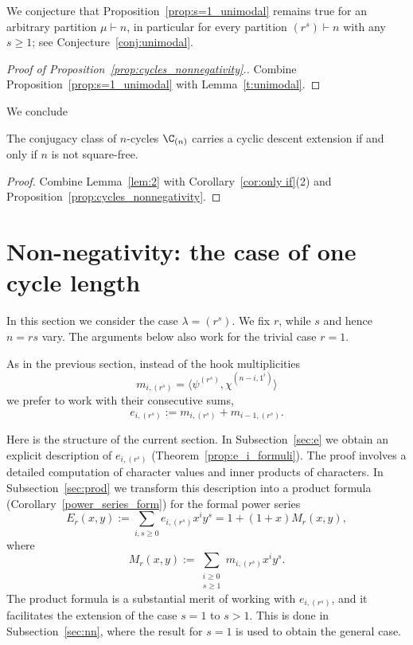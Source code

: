 \begin{remark}
	We conjecture that Proposition~\ref{prop:s=1_unimodal} remains true for an arbitrary partition $\mu \vdash n$, in particular for every partition $(r^s) \vdash n$ with any	$s\ge 1$; see Conjecture~\ref{conj:unimodal}.
\end{remark}

\begin{proof}[Proof of Proposition~\ref{prop:cycles_nonnegativity}.]
    Combine Proposition~\ref{prop:s=1_unimodal} with   Lemma~\ref{t:unimodal}.
\end{proof}

We conclude 

\begin{corollary}\label{prop:CDE_cycles}
    The conjugacy class of $n$-cycles $\C_{(n)}$ carries a cyclic descent extension if and only if $n$ is not square-free.
\end{corollary}
	 
\begin{proof} 
    Combine Lemma~\ref{lem:2} with Corollary~\ref{cor:only if}(2) and Proposition~\ref{prop:cycles_nonnegativity}. 
\end{proof}


\section{Non-negativity: the case of one cycle length}
\label{sec:Witt}

In this section we consider the case $\lambda = (r^s)$. 
We fix $r$, while $s$ and hence $n=rs$ vary. 
The arguments below also work for the trivial case $r=1$.
		
As in the previous section, instead of the hook multiplicities 
\[
    m_{i,(r^s)} 
    = \langle \psi^{(r^s)}, \chi^{(n-i,1^i)} \rangle
\]
we prefer to work with their consecutive sums,
\[
    e_{i,(r^s)} := m_{i,(r^s)} + m_{i-1,(r^s)}.
\]
		
Here is the structure of the current section.
In Subsection~\ref{sec:e} 
we obtain an explicit description of $e_{i,(r^s)}$ (Theorem~\ref{prop:e_i_formuli}). The proof involves a detailed computation of character values and inner products of characters.
In Subsection~\ref{sec:prod} we 
transform this description into
a product formula (Corollary~\ref{power_series_form})
for the formal power series 
\[
E_r(x,y) 
:= \sum_{i,s \ge 0} e_{i,(r^s)} x^i y^s 
= 1 + (1 + x) M_r(x,y),  
\]
where 
\[
M_r(x,y) 
:= \sum_{\substack{i \ge 0 \\ s \ge 1}} m_{i,(r^s)} x^i y^s.
\]
The product formula is a substantial merit of working with $e_{i,(r^s)}$, and it facilitates the extension of the case $s=1$ to $s>1$. 
This is done in Subsection~\ref{sec:nn}, where the result for $s=1$ is used to obtain the general case.
		

